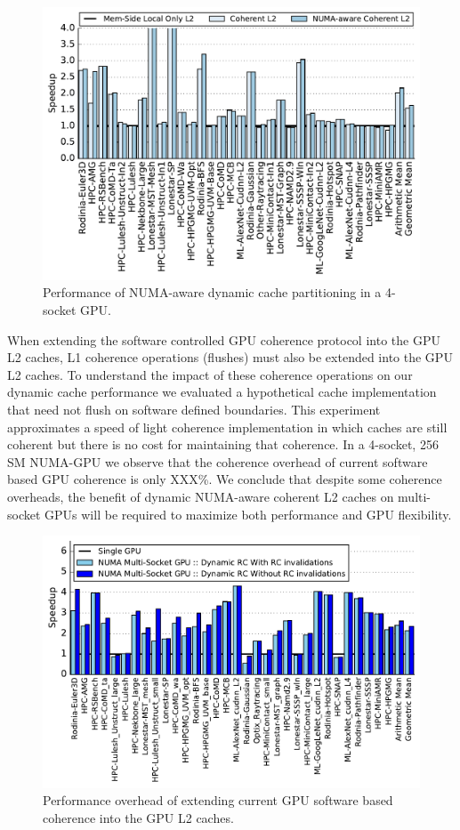 \begin{figure}[t]
    \centering
    \includegraphics[width=1.0\columnwidth]{figures/plot_dynamic_cache_WB.pdf}
    \caption{Performance of NUMA-aware dynamic cache partitioning in a 4-socket GPU.}
    \label{fig:dynamiccaching}
\end{figure}

When extending the software controlled GPU coherence protocol into the GPU L2 caches,
L1 coherence operations (flushes) must also be extended into the GPU L2 caches.  To understand
the impact of these coherence operations on our dynamic cache performance we evaluated a hypothetical
cache implementation that need not flush on software defined boundaries.  This experiment
approximates a speed of light coherence implementation in which caches are still coherent but
there is no cost for maintaining that coherence.  In a 4-socket, 256 SM NUMA-GPU we observe
that the coherence overhead of current software based GPU coherence is only XXX\%.  We conclude
that despite some coherence overheads, the benefit of dynamic NUMA-aware coherent L2 caches
on multi-socket GPUs will be required to maximize both performance and GPU flexibility.

\begin{figure}[t]
    \centering
    \includegraphics[width=1.0\columnwidth]{figures/plot_no_inval_WB.pdf}
    \caption{Performance overhead of extending current GPU software based coherence
    into the GPU L2 caches.}
    \label{fig:invalidations}
\end{figure}
